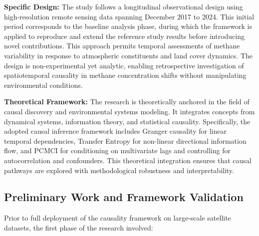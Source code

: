 \textbf{Specific Design:}
The study follows a longitudinal observational design using high-resolution remote sensing data spanning December 2017 to 2024. This initial period corresponds to the baseline analysis phase, during which the framework is applied to reproduce and extend the reference study results before introducing novel contributions. This approach permits temporal assessments of methane variability in response to atmospheric constituents and land cover dynamics. The design is non-experimental yet analytic, enabling retrospective investigation of spatiotemporal causality in methane concentration shifts without manipulating environmental conditions.

\textbf{Theoretical Framework:}
The research is theoretically anchored in the field of causal discovery and environmental systems modeling. It integrates concepts from dynamical systems, information theory, and statistical causality. Specifically, the adopted causal inference framework includes Granger causality for linear temporal dependencies, Transfer Entropy for non-linear directional information flow, and PCMCI for conditioning on multivariate lags and controlling for autocorrelation and confounders. This theoretical integration ensures that causal pathways are explored with methodological robustness and interpretability.

\subsection{Preliminary Work and Framework Validation}

Prior to full deployment of the causality framework on large-scale satellite datasets, the first phase of the research involved:

